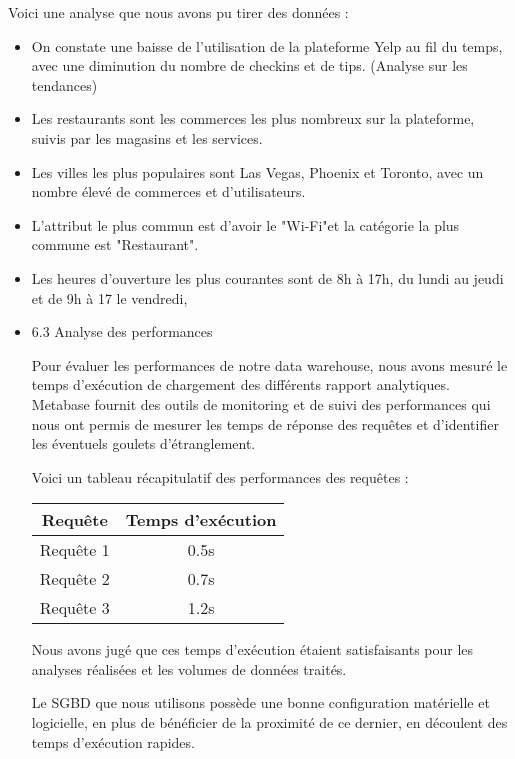 \begin{itemize}
Voici une analyse que nous avons pu tirer des données :

\begin{itemize}

\item On constate une baisse de l'utilisation de la plateforme Yelp au fil du temps, avec une diminution du nombre de checkins et de tips. (Analyse sur les tendances)

\item Les restaurants sont les commerces les plus nombreux sur la plateforme, suivis par les magasins et les services.

\item Les villes les plus populaires sont Las Vegas, Phoenix et Toronto, avec un nombre élevé de commerces et d'utilisateurs.

\item L'attribut le plus commun est d'avoir le "Wi-Fi"et la catégorie la plus commune est "Restaurant".

\item Les heures d'ouverture les plus courantes sont de 8h à 17h, du lundi au jeudi et de 9h à 17 le vendredi,


\item 6.3 Analyse des performances

Pour évaluer les performances de notre data warehouse, nous avons mesuré le temps d’exécution de chargement des différents rapport analytiques.
Metabase fournit des outils de monitoring et de suivi des performances qui nous ont permis de mesurer les temps de réponse des requêtes et d’identifier les éventuels goulets d’étranglement.

Voici un tableau récapitulatif des performances des requêtes :

\begin{center}
\begin{tabular}{|c|c|}
\hline
Requête & Temps d'exécution \\
\hline
Requête 1 & 0.5s \\
\hline
Requête 2 & 0.7s \\
\hline
Requête 3 & 1.2s \\
\hline
\end{tabular}
\end{center}

Nous avons jugé que ces temps d'exécution étaient satisfaisants pour les analyses réalisées et les volumes de données traités.

Le SGBD que nous utilisons possède une bonne configuration matérielle et logicielle, en plus de bénéficier de la proximité de ce dernier, en découlent des temps d'exécution rapides.




\end{itemize}
\end{itemize}
